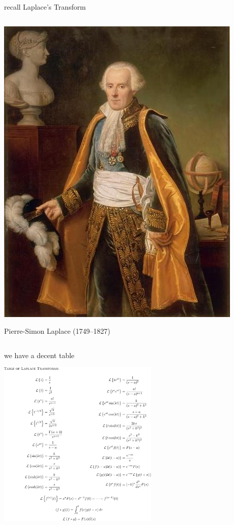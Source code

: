 \documentclass[dvipsnames,colorlinks]{beamer}
\begin{document}
\begin{frame}{recall Laplace's Transform}
\begin{columns}
\begin{column}{0.23\textwidth}
\vspace{3mm}
\includegraphics[width=\textwidth]{figs/Laplace-grand}

\tiny
Pierre-Simon Laplace (1749--1827) 
\end{column}
\end{columns}
\end{frame}


\begin{frame}{we have a decent table}

\vspace{-2mm}
\begin{center}
\includegraphics[height=80mm]{figs/fulllaplacetable}
\end{center}
\end{frame}
\end{document}
